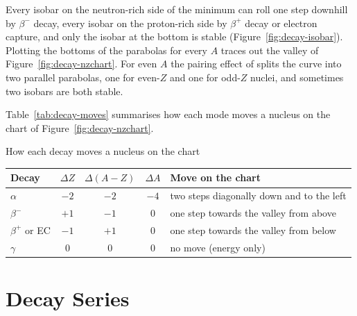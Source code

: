Every isobar on the neutron-rich side of the minimum can roll one step downhill by $\beta^-$ decay, every
isobar on the proton-rich side by $\beta^+$ decay or electron capture, and only the isobar at the bottom is
stable (Figure~\ref{fig:decay-isobar}). Plotting the bottoms of the parabolas for every $A$ traces out the
valley of Figure~\ref{fig:decay-nzchart}. For even $A$ the pairing effect of  splits the
curve into two parallel parabolas, one for even-$Z$ and one for odd-$Z$ nuclei, and sometimes two isobars
are both stable.

\begin{figure}[htbp]
\centering
{}
\end{figure}

Table~\ref{tab:decay-moves} summarises how each mode moves a nucleus on the chart of
Figure~\ref{fig:decay-nzchart}.

\begin{tablebox}{How each decay moves a nucleus on the chart}
\centering
\begin{tabular}{@{}lcccl@{}}
\toprule
\textbf{Decay} & $\Delta Z$ & $\Delta(A-Z)$ & $\Delta A$ & \textbf{Move on the chart}\\
\midrule
$\alpha$ & $-2$ & $-2$ & $-4$ & two steps diagonally down and to the left\\
$\beta^-$ & $+1$ & $-1$ & $0$ & one step towards the valley from above\\
$\beta^+$ or EC & $-1$ & $+1$ & $0$ & one step towards the valley from below\\
$\gamma$ & $0$ & $0$ & $0$ & no move (energy only)\\
\bottomrule
\end{tabular}\label{tab:decay-moves}
\end{tablebox}

\section{Decay Series}\label{sec:decay-series}

